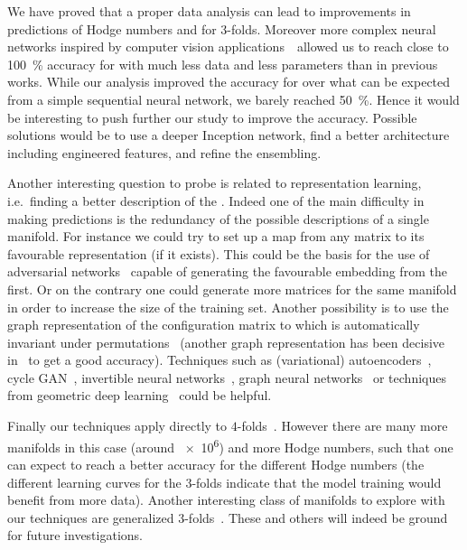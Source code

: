 We have proved that a proper data analysis can lead to improvements in predictions of Hodge numbers  and  for \cicy $3$-folds.
Moreover more complex neural networks inspired by computer vision applications~\cite{Szegedy:2015:GoingDeeperConvolutions, Szegedy:2016:RethinkingInceptionArchitecture, Szegedy:2016:Inceptionv4InceptionresnetImpact} allowed us to reach close to \SI{100}{\percent} accuracy for  with much less data and less parameters than in previous works.
While our analysis improved the accuracy for  over what can be expected from a simple sequential neural network, we barely reached \SI{50}{\percent}.
Hence it would be interesting to push further our study to improve the accuracy.
Possible solutions would be to use a deeper Inception network, find a better architecture including engineered features, and refine the ensembling.

Another interesting question to probe is related to representation learning, i.e.\ finding a better description of the \cy.
Indeed one of the main difficulty in making predictions is the redundancy of the possible descriptions of a single manifold.
For instance we could try to set up a map from any matrix to its favourable representation (if it exists).
This could be the basis for the use of adversarial networks~\cite{Goodfellow:2014:GenerativeAdversarialNets} capable of generating the favourable embedding from the first.
Or on the contrary one could generate more matrices for the same manifold in order to increase the size of the training set.
Another possibility is to use the graph representation of the configuration matrix to which is automatically invariant under permutations~\cite{Hubsch:1992:CalabiyauManifoldsBestiary} (another graph representation has been decisive in~\cite{Krippendorf:2020:DetectingSymmetriesNeural} to get a good accuracy).
Techniques such as (variational) autoencoders~\cite{Kingma:2014:AutoEncodingVariationalBayes, Rezende:2014:StochasticBackpropagationApproximate}, cycle GAN~\cite{Zhu:2017:UnpairedImagetoimageTranslation}, invertible neural networks~\cite{Ardizzone:2019:AnalyzingInverseProblems}, graph neural networks~\cite{Gori:2005:NewModelLearning, Scarselli:2004:GraphicalbasedLearningEnvironments} or techniques from geometric deep learning~\cite{Monti:2017:GeometricDeepLearning} could be helpful.

Finally our techniques apply directly to \cicy $4$-folds~\cite{Gray:2013:AllCompleteIntersection, Gray:2014:TopologicalInvariantsFibration}.
However there are many more manifolds in this case (around \num{e6}) and more Hodge numbers, such that one can expect to reach a better accuracy for the different Hodge numbers (the different learning curves for the $3$-folds indicate that the model training would benefit from more data).
Another interesting class of manifolds to explore with our techniques are generalized \cicy $3$-folds~\cite{Anderson:2016:NewConstructionCalabiYau}.
These and others will indeed be ground for future investigations.


